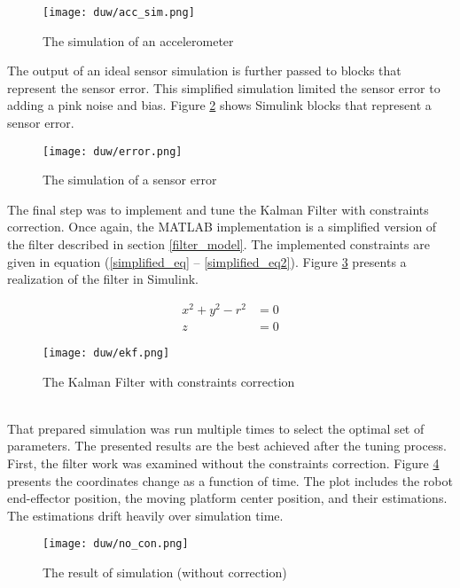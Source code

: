 \begin{figure}[!h]
	\centering
	\texttt{[image: duw/acc\_sim.png]}
	\caption{The simulation of an accelerometer}
	\label{acc_sym}
\end{figure}

The output of an ideal sensor simulation is further passed to blocks that represent the sensor error. This simplified simulation limited the sensor error to adding a pink noise and bias. Figure \ref{error_sensor} shows Simulink blocks that represent a sensor error.

\begin{figure}[!h]
	\centering
	\texttt{[image: duw/error.png]}
	\caption{The simulation of a sensor error}
	\label{error_sensor}
\end{figure}

The final step was to implement and tune the Kalman Filter with constraints correction. Once again, the MATLAB implementation is a simplified version of the filter described in section \ref{filter_model}. The implemented constraints are given in equation (\ref{simplified_eq} -- \ref{simplified_eq2}). Figure \ref{ekf_sim} presents a realization of the filter in Simulink.

\begin{align}
	x^2 + y^2 - r^2 &= 0
	\label{simplified_eq}\\
	z &= 0
	\label{simplified_eq2}
\end{align}

\begin{figure}[!h]
	\centering
	\texttt{[image: duw/ekf.png]}
	\caption{The Kalman Filter with constraints correction}
	\label{ekf_sim}
\end{figure}
\ \\

That prepared simulation was run multiple times to select the optimal set of parameters. The presented results are the best achieved after the tuning process. First, the filter work was examined without the constraints correction. Figure \ref{no_con} presents the coordinates change as a function of time. The plot includes the robot end-effector position, the moving platform center position, and their estimations. The estimations drift heavily over simulation time.\\

\begin{figure}[!h]
	\centering
	\texttt{[image: duw/no\_con.png]}
	\caption{The result of simulation (without correction)}
	\label{no_con}
\end{figure}

